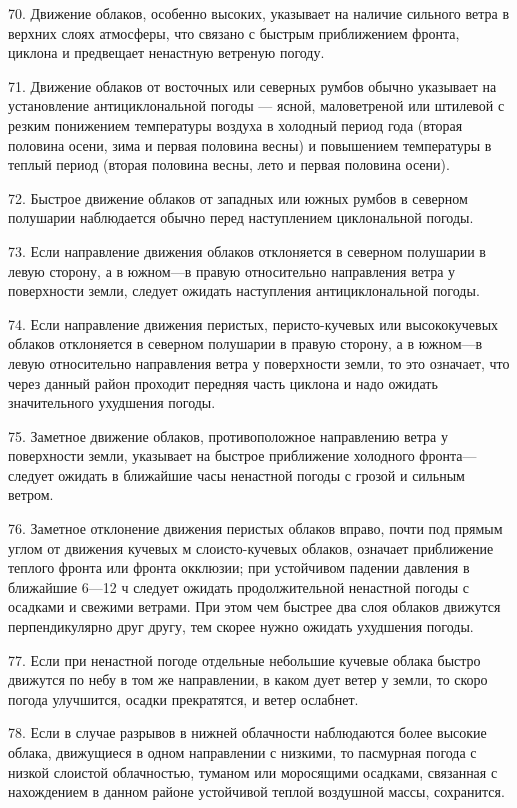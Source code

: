 70. Движение облаков, особенно высоких, указывает на наличие сильного ветра в верхних слоях атмосферы, что связано с быстрым приближением фронта, циклона и предвещает ненастную ветреную погоду.

71. Движение облаков от восточных или северных румбов обычно указывает на установление антициклональной погоды — ясной, маловетреной или штилевой с резким понижением температуры воздуха в холодный период года (вторая половина осени, зима и первая половина весны) и повышением температуры в теплый период (вторая половина весны, лето и первая половина осени).

72. Быстрое движение облаков от западных или южных румбов в северном полушарии наблюдается обычно перед наступлением циклональной погоды.

73. Если направление движения облаков отклоняется в северном полушарии в левую сторону, а в южном—в правую относительно направления ветра у поверхности земли, следует ожидать наступления антициклональной погоды.

74. Если направление движения перистых, перисто-кучевых или высококучевых облаков отклоняется в северном полушарии в правую сторону, а в южном—в левую относительно направления ветра у поверхности земли, то это означает, что через данный район проходит передняя часть циклона и надо ожидать значительного ухудшения погоды.

75. Заметное движение облаков, противоположное направлению ветра у поверхности земли, указывает на быстрое приближение холодного фронта—следует ожидать в ближайшие часы ненастной погоды с грозой и сильным ветром.

76. Заметное отклонение движения перистых облаков вправо, почти под прямым углом от движения кучевых м слоисто-кучевых облаков, означает приближение теплого фронта или фронта окклюзии; при устойчивом падении давления в ближайшие 6—12 ч следует ожидать продолжительной ненастной погоды с осадками и свежими ветрами. При этом чем быстрее два слоя облаков движутся перпендикулярно друг другу, тем скорее нужно ожидать ухудшения погоды.

77. Если при ненастной погоде отдельные небольшие кучевые облака быстро движутся по небу в том же направлении, в каком дует ветер у земли, то скоро погода улучшится, осадки прекратятся, и ветер ослабнет.

78. Если в случае разрывов в нижней облачности наблюдаются более высокие облака, движущиеся в одном направлении с низкими, то пасмурная погода с низкой слоистой облачностью, туманом или моросящими осадками, связанная с нахождением в данном районе устойчивой теплой воздушной массы, сохранится.


